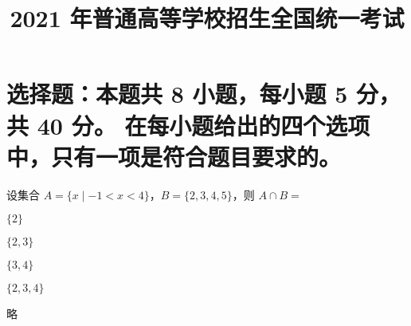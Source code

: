 \documentclass{exam-zh-pro}
\title{2021 年普通高等学校招生全国统一考试}
\begin{document}
\section{%
  选择题：本题共 8 小题，每小题 5 分，共 40 分。
  在每小题给出的四个选项中，只有一项是符合题目要求的。
}


\begin{question}[points = 2]
  设集合 $A = \{x \mid -1 < x < 4\}$，$B = \{2, 3, 4, 5\}$，则 $A \cap B = $ \paren[A]

  \begin{choices}
    \item $\{2\}$
    \item $\{2, 3\}$
    \item $\{3, 4\}$
    \item $\{2, 3, 4\}$
  \end{choices}
\end{question}

\begin{solution}
  略
\end{solution}








\end{document}
